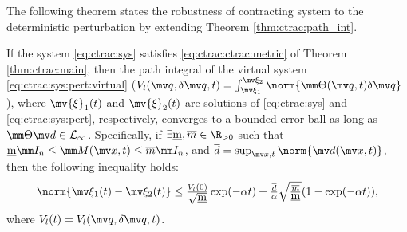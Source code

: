 The following theorem states the robustness of contracting system to the deterministic perturbation by extending Theorem \ref{thm:ctrac:path_int}.

\begin{theorem}
    If the system \eqref{eq:ctrac:sys} satisfies \eqref{eq:ctrac:ctrac:metric} of Theorem \ref{thm:ctrac:main}, then the path integral of the virtual system \eqref{eq:ctrac:sys:pert:virtual} (\ie $V_l(\bdq,\delta\bdq,t)=\int_{\mv\xi_1}^{\mv\xi_2}\norm{\mm\Theta(\bdq,t)\delta\bdq}$), where $\mv{\xi}_1(t)$ and $\mv{\xi}_2(t)$ are solutions of \eqref{eq:ctrac:sys} and \eqref{eq:ctrac:sys:pert}, respectively, converges to a bounded error ball as long as $\mm\Theta\bdd\in \mathcal{L}_\infty$.
    Specifically, if $\exists \underbar m, \overline m\in\R_{>0}$ such that $\underbar m\mm I_n\le\mm M(\bdx,t)\le\overline m\mm I_n$, and $\overline d = \sup_{\bdx,t} \norm{\bdd(\bdx,t)}$, then the following inequality holds:
    \begin{equation}
        \norm{\mv\xi_1(t)-\mv\xi_2(t)}
        \le
        \tfrac{V_{l}(0)}{\sqrt{\underbar{m}}}
        \exp(-\alpha t)
        +
        \tfrac{\overline d}{\alpha}
        \sqrt{\tfrac{\overline m}{\underbar m}}
        (1-\exp(-\alpha t))
        ,
    \end{equation}
    where $V_l(t)=V_l(\bdq,\delta\bdq,t)$.
    \label{thm:ctrac:pert}
\end{theorem}

